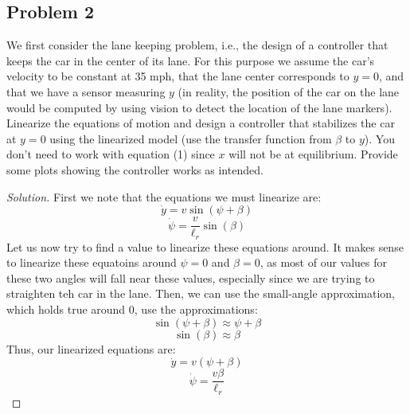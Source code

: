 \documentclass{article}
\begin{document}
\subsection*{Problem 2}
We first consider the lane keeping problem, i.e., the design of a controller that keeps the car in the center of its lane. For this purpose we assume the car’s velocity to be constant at 35 mph, that the lane center corresponds to $y = 0$, and that we have a sensor measuring $y$ (in reality, the position of the car on the lane would be computed by using vision to detect the location of the lane markers). Linearize the equations of motion and design a controller that stabilizes the car at $y = 0$ using the linearized model (use the transfer function from $\beta$ to $y$). You don’t need to work with equation (1) since $x$ will not be at equilibrium. Provide some plots showing the controller works as intended.
\begin{proof}[Solution]

First we note that the equations we must linearize are:
\[\dot{y} = v\sin(\psi+\beta)
\]
\[\dot{\psi} = \frac{v}{\ell_r}\sin(\beta)
\]
Let us now try to find a value to linearize these equations around. It makes sense to linearize these equatoins around $\psi = 0$ and $\beta = 0$, as most of our values for these two angles will fall near these values, especially since we are trying to straighten teh car in the lane.
\newline
Then, we can use the small-angle approximation, which holds true around $0$, use the approximations:
\[\sin(\psi+\beta) \approx \psi+\beta 
\]
\[\sin(\beta) \approx \beta
\]
Thus, our linearized equations are:
\[\dot{y} = v(\psi + \beta)
    \]
\[\dot{\psi} = \frac{v\beta}{\ell_r}
    \]
\end{proof}
\end{document}
